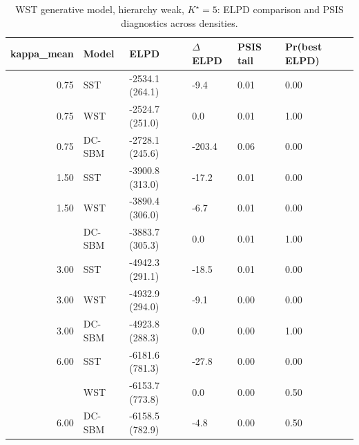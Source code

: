 \begin{table}
\centering
\caption{WST generative model, hierarchy weak, $K^\star=5$: ELPD comparison and PSIS diagnostics across densities.}
\centering
\begin{tabular}[t]{rlllll}
\toprule
kappa_mean & Model & ELPD & $\Delta$ELPD & PSIS tail & Pr(best ELPD)\\
\midrule
0.75 & SST & -2534.1 (264.1) & -9.4 & 0.01 & 0.00\\
0.75 & WST & -2524.7 (251.0) & 0.0 & 0.01 & 1.00\\
0.75 & DC-SBM & -2728.1 (245.6) & -203.4 & 0.06 & 0.00\\
1.50 & SST & -3900.8 (313.0) & -17.2 & 0.01 & 0.00\\
1.50 & WST & -3890.4 (306.0) & -6.7 & 0.01 & 0.00\\
\addlinespace
1.50 & DC-SBM & -3883.7 (305.3) & 0.0 & 0.01 & 1.00\\
3.00 & SST & -4942.3 (291.1) & -18.5 & 0.01 & 0.00\\
3.00 & WST & -4932.9 (294.0) & -9.1 & 0.00 & 0.00\\
3.00 & DC-SBM & -4923.8 (288.3) & 0.0 & 0.00 & 1.00\\
6.00 & SST & -6181.6 (781.3) & -27.8 & 0.00 & 0.00\\
\addlinespace
6.00 & WST & -6153.7 (773.8) & 0.0 & 0.00 & 0.50\\
6.00 & DC-SBM & -6158.5 (782.9) & -4.8 & 0.00 & 0.50\\
\bottomrule
\end{tabular}
\end{table}
